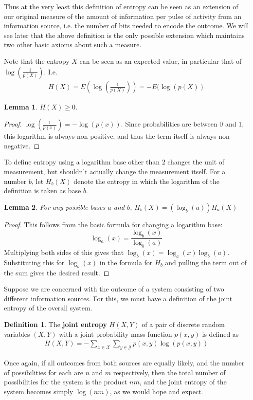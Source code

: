\documentclass{article}
\theoremstyle{definition}
\newtheorem{definition}{Definition}[section]
\theoremstyle{plain}
\newtheorem{lemma}{Lemma}[section]
\begin{document}
Thus at the very least this definition of entropy can be seen as an extension of our original measure of the amount of information per pulse of activity from an information source, i.e. the number of bits needed to encode the outcome. We will see later that the above definition is the only possible extension which maintains two other basic axioms about such a measure. \par 
Note that the entropy $X$ can be seen as an expected value, in particular that of $\log(\frac{1}{p(X)})$. I.e.
\begin{align}
	H(X) = E\left(\log\left(\frac{1}{p(X)}\right)\right) = -E(\log(p(X))
\end{align}
\begin{lemma}
	$H(X) \geq 0$.
\end{lemma}
\begin{proof}
	$\log(\frac{1}{p(x)}) = -\log(p(x))$. Since probabilities are between $0$ and $1$, this logarithm is always non-positive, and thus the term itself is always non-negative. 
\end{proof}
To define entropy using a logarithm base other than $2$ changes the unit of measurement, but shouldn't actually change the measurement itself. For a number $b$, let $H_b(X)$ denote the entropy in which the logarithm of the definition is taken as base $b$. 
\begin{lemma}	
	For any possible bases $a$ and $b$, $H_b(X) = (\log_b(a))H_a(X)$
\end{lemma}
\begin{proof}
	This follows from the basic formula for changing a logarithm base: 
	\[ \log_a(x) = \frac{\log_b(x)}{\log_b(a)} \]
	Multiplying both sides of this gives that $\log_b(x) = \log_a(x)\log_b(a)$. Substituting this for $\log_b(x)$ in the formula for $H_b$ and pulling the term out of the sum gives the desired result. 
\end{proof}
Suppose we are concerned with the outcome of a system consisting of two different information sources. For this, we must have a definition of the joint entropy of the overall system.
\begin{definition}
	The \textbf{joint entropy} $H(X,Y)$ of a pair of discrete random variables $(X,Y)$ with a joint probability mass function $p(x,y)$ is defined as 
	\begin{align}
		H(X,Y) = -\sum_{x \in \mathcal{X}} \sum_{y \in \mathcal{Y}} p(x,y)\log(p(x,y))
	\end{align}
\end{definition}
Once again, if all outcomes from both sources are equally likely, and the number of possibilities for each are $n$ and $m$ respectively, then the total number of possibilities for the system is the product $nm$, and the joint entropy of the system becomes simply $\log(nm)$, as we would hope and expect. \par 
\end{document}
